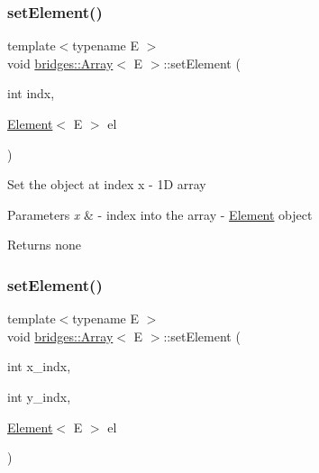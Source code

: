 \mbox{\label{classbridges_1_1_array_aae8ec0bd850e00593487022bc914afe0}} 
\subsubsection{\texorpdfstring{set\+Element()}{setElement()}\hspace{0.1cm}{\footnotesize\ttfamily [1/3]}}
{\footnotesize\ttfamily template$<$typename E $>$ \\
void \mbox{\hyperlink{classbridges_1_1_array}{bridges\+::\+Array}}$<$ E $>$\+::set\+Element (\begin{DoxyParamCaption}\item[{int}]{indx,  }\item[{\mbox{\hyperlink{classbridges_1_1_element}{Element}}$<$ E $>$}]{el }\end{DoxyParamCaption})\hspace{0.3cm}{\ttfamily [inline]}}

Set the object at index x -\/ 1D array


\begin{DoxyParams}{Parameters}
{\em x} & -\/ index into the array  -\/ \mbox{\hyperlink{classbridges_1_1_element}{Element}} object\\
\hline
\end{DoxyParams}
\begin{DoxyReturn}{Returns}
none 
\end{DoxyReturn}
\mbox{\label{classbridges_1_1_array_a428cc76d22af71c5ae57dc293780b8ec}} 
\subsubsection{\texorpdfstring{set\+Element()}{setElement()}\hspace{0.1cm}{\footnotesize\ttfamily [2/3]}}
{\footnotesize\ttfamily template$<$typename E $>$ \\
void \mbox{\hyperlink{classbridges_1_1_array}{bridges\+::\+Array}}$<$ E $>$\+::set\+Element (\begin{DoxyParamCaption}\item[{int}]{x\+\_\+indx,  }\item[{int}]{y\+\_\+indx,  }\item[{\mbox{\hyperlink{classbridges_1_1_element}{Element}}$<$ E $>$}]{el }\end{DoxyParamCaption})\hspace{0.3cm}{\ttfamily [inline]}}

